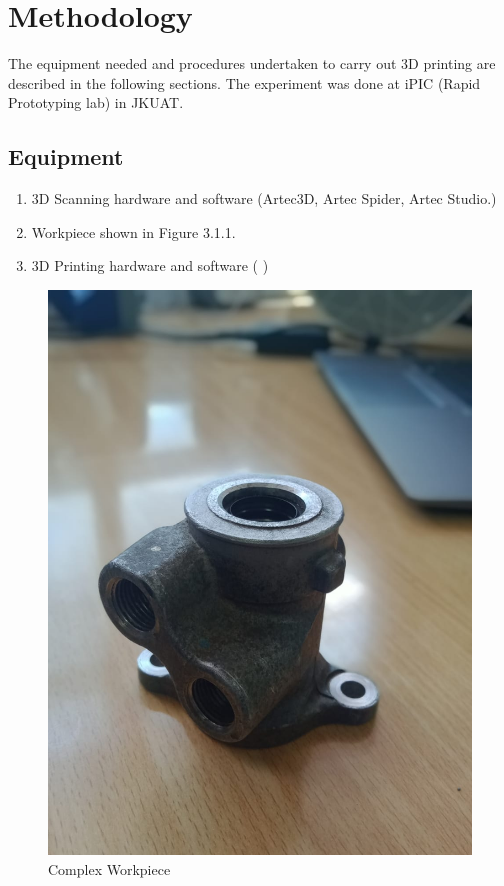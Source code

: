 \chapter{Methodology}

The equipment needed and procedures undertaken to carry out 3D printing  are described in the following sections. The experiment was done at iPIC (Rapid Prototyping lab) in JKUAT.
\section{Equipment}
\begin{enumerate}
\item 3D Scanning hardware and software (Artec3D, Artec Spider, Artec Studio.)
\item Workpiece shown in Figure 3.1.1.
\item 3D Printing hardware and software ( )
\end{enumerate}
\begin{center}
	\begin{figure}[!h]
	\centering
	\includegraphics[width=0.5\linewidth]{Figures/Figure}
	\caption{Complex Workpiece}
	\end{figure}
\end{center}

